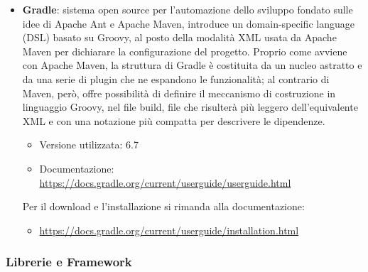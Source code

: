 \begin{itemize}
	\item \textbf{Gradle}: sistema open source per l'automazione dello sviluppo fondato sulle idee di Apache Ant e Apache Maven, introduce un domain-specific language (DSL) basato su Groovy, al posto della modalità XML usata da Apache Maven per dichiarare la configurazione del progetto. Proprio come avviene con Apache Maven, la struttura di Gradle è costituita da un nucleo astratto e da una serie di plugin che ne espandono le funzionalità; al contrario di Maven, però, offre possibilità di definire il meccanismo di costruzione in linguaggio Groovy, nel file build, file che risulterà più leggero dell'equivalente XML e con una notazione più compatta per descrivere le dipendenze.
	\begin{itemize}
		\item Versione utilizzata: 6.7
		\item Documentazione: \url{https://docs.gradle.org/current/userguide/userguide.html}
	\end{itemize}
	Per il download e l'installazione si rimanda alla documentazione:
	\begin{itemize}
		\item \url{https://docs.gradle.org/current/userguide/installation.html}
	\end{itemize}

\end{itemize}

\subsubsection{Librerie e Framework}

